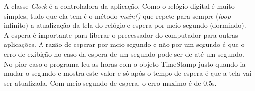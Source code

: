 \documentclass[
	article,			%
	12pt,				%
	openright,
	twoside,			%
	a4paper,			%
	english,			%
	french,
	brazil,				%
	sumario=tradicional
	]{abntex2}
\begin{document}
A classe \emph{Clock} é a controladora da aplicação. Como o relógio digital é muito simples, tudo que ela tem é o método \emph{main()} que repete para sempre (\emph{loop} infinito) a atualização da tela do relógio e espera por meio segundo (dormindo). A espera é importante para liberar o processador do computador para outras aplicações. A razão de esperar por meio segundo e não por um segundo é que o erro de exibição no caso da espera de um segundo pode ser de até um segundo. No pior caso o programa leu as horas com o objeto TimeStamp justo quando ia mudar o segundo e mostra este valor e só após o tempo de espera é que a tela vai ser atualizada. Com meio segundo de espera, o erro máximo é de 0,5s.

% 

%
%
%

\postextual



%
%
% 



\
\end{document}
